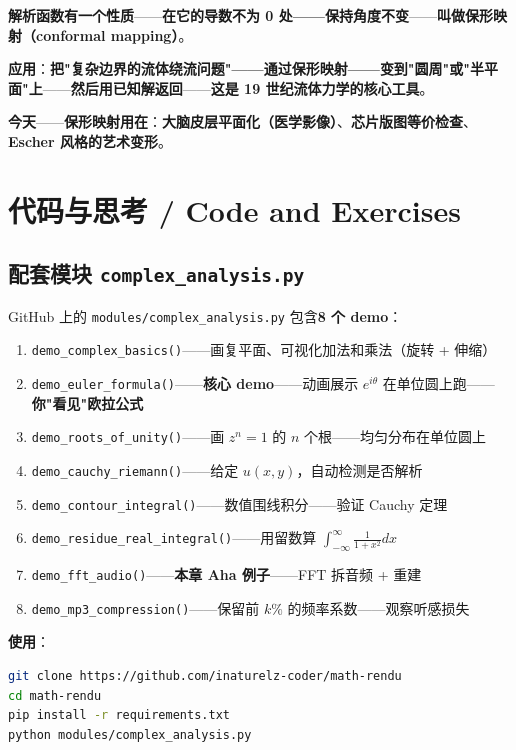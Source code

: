 \textbf{解析函数有一个性质}——\textbf{在它的导数不为 0 处——保持角度不变}——\textbf{叫做\textbf{保形映射}（conformal mapping）}。

\textbf{应用}：\textbf{把"复杂边界的流体绕流问题"——通过保形映射——\textbf{变到"圆周"或"半平面"上}}——\textbf{然后用已知解返回}——\textbf{这是 19 世纪流体力学的核心工具}。

\textbf{今天}——\textbf{保形映射用在}：\textbf{大脑皮层平面化（医学影像）}、\textbf{芯片版图等价检查}、\textbf{Escher 风格的艺术变形}。

\section{代码与思考 / Code and Exercises}

\subsection{配套模块 \texttt{complex\_analysis.py}}

GitHub 上的 \texttt{modules/complex\_analysis.py} 包含\textbf{8 个 demo}：

\begin{enumerate}
\item \texttt{demo\_complex\_basics()}——画复平面、可视化加法和乘法（旋转 + 伸缩）
\item \texttt{demo\_euler\_formula()}——\textbf{核心 demo}——动画展示 $e^{i\theta}$ 在单位圆上跑——\textbf{你"看见"欧拉公式}
\item \texttt{demo\_roots\_of\_unity()}——画 $z^n = 1$ 的 $n$ 个根——均匀分布在单位圆上
\item \texttt{demo\_cauchy\_riemann()}——给定 $u(x,y)$，自动检测是否解析
\item \texttt{demo\_contour\_integral()}——数值围线积分——验证 Cauchy 定理
\item \texttt{demo\_residue\_real\_integral()}——用留数算 $\int_{-\infty}^{\infty} \frac{1}{1+x^2}dx$
\item \texttt{demo\_fft\_audio()}——\textbf{本章 Aha 例子}——FFT 拆音频 + 重建
\item \texttt{demo\_mp3\_compression()}——保留前 $k\%$ 的频率系数——观察听感损失
\end{enumerate}

\textbf{使用}：

\begin{lstlisting}[language=bash]
git clone https://github.com/inaturelz-coder/math-rendu
cd math-rendu
pip install -r requirements.txt
python modules/complex_analysis.py
\end{lstlisting}

